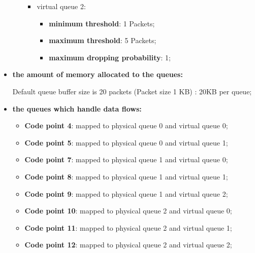 \documentclass[conference,compsoc]{IEEEtran}
\begin{document}
\begin{itemize}
\begin{itemize}
\begin{itemize}
	   \item virtual queue 2:
   	  \begin{itemize}
     			\item \textbf{minimum threshold}: 1 Packets;
 			    \item \textbf{maximum threshold}: 5 Packets;
   			  \item \textbf{maximum dropping probability}: 1;
  	   \end{itemize}   
    \end{itemize}

     
     \end{itemize}

     \vspace{5mm}
     \item \textbf{the amount of memory allocated to the queues:}\par

     Default queue buffer size is 20 packets (Packet size 1 KB) : 20KB per queue;


     \vspace{5mm}
     \item \textbf{the queues which handle data flows:}\par
     \begin{itemize}
     \item \textbf{Code point 4}: mapped to physical queue 0 and virtual queue 0;
     \item \textbf{Code point 5}: mapped to physical queue 0 and virtual queue 1;
          
     \item \textbf{Code point 7}: mapped to physical queue 1 and virtual queue 0;
     \item \textbf{Code point 8}: mapped to physical queue 1 and virtual queue 1;
     \item \textbf{Code point 9}: mapped to physical queue 1 and virtual queue 2;

     \item \textbf{Code point 10}: mapped to physical queue 2 and virtual queue 0;
     \item \textbf{Code point 11}: mapped to physical queue 2 and virtual queue 1;
     \item \textbf{Code point 12}: mapped to physical queue 2 and virtual queue 2;


     \end{itemize}


     \end{itemize}
     
\end{document}

